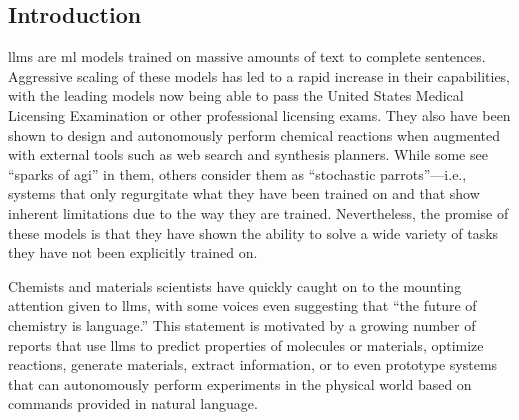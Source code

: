\documentclass[11pt, oneside]{article}
\begin{document}
\clearpage
\begin{refsection}
\section{Introduction}
\Glspl{llm} are \gls{ml} models trained on massive amounts of text to complete sentences.
Aggressive scaling of these models has led to a rapid increase in their capabilities,\autocite{brown2020language,zhong2024benchmarking} with the leading models now being able to pass the United States Medical Licensing Examination\autocite{kung2023performance} or other professional licensing exams.
They also have been shown to design and autonomously perform chemical reactions when augmented with external tools such as web search and synthesis planners.\autocite{openai2024gpt4, Boiko_2023, bran2023chemcrow, darvish2024organa}
While some see \enquote{sparks of \gls{agi}} in them,\autocite{bubeck2023sparks} others consider them as \enquote{stochastic parrots}---i.e., systems that only regurgitate what they have been trained on\autocite{bender2021dangers} and that show inherent limitations due to the way they are trained.\autocite{mccoy2023embersautoregressionunderstandinglarge}
Nevertheless, the promise of these models is that they have shown the ability to solve a wide variety of tasks they have not been explicitly trained on.\autocite{bommasani2021opportunities, anderljung2023frontier, ai4science2023impact}

Chemists and materials scientists have quickly caught on to the mounting attention given to \glspl{llm}, with some voices even suggesting that \enquote{the future of chemistry is language.}\autocite{White_2023}
This statement is motivated by a growing number of reports that use \glspl{llm} to predict properties of molecules or materials,\autocite{jablonka202314, jablonka2024leveraging, xie2024fine, liao2024words, zhang2024chemllm, zhong2024benchmarking}  optimize reactions,\autocite{ramos2023bayesian, kristiadi2024sober}  generate materials,\autocite{rubungo2023llm, flam2023language, gruver2024fine, alampara2024mattextlanguagemodelsneed} extract information,\autocite{Patiny_2023, Dagdelen_2024, Zheng_2024, lala2023paperqa, caufield2023structured, gupta2022discomat, schillingwilhelmi2024textinsightlargelanguage, skarlinski2024language} or to even prototype systems that can autonomously perform experiments in the physical world based on commands provided in natural language.\autocite{bran2023chemcrow, Boiko_2023, darvish2024organa}


\end{refsection}
\end{document}

